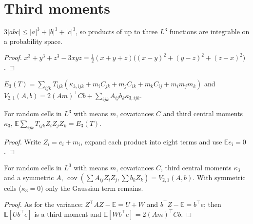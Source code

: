 \section{Third moments}

\begin{lemma}\label{lem:cumulants_integrable3}
  \leanok
  $3|abc| \le |a|^3 + |b|^3 + |c|^3$, so products of up to three $L^3$ functions are integrable
  on a probability space.
\end{lemma}
\begin{proof}
  \leanok
  $x^3 + y^3 + z^3 - 3xyz = \tfrac12(x+y+z)\bigl((x-y)^2 + (y-z)^2 + (z-x)^2\bigr)$.
\end{proof}

\begin{definition}\label{def:eCubic}
  \leanok
  $E_3(T) = \sum_{ijk} T_{ijk}(\kappa_{3,ijk} + m_iC_{jk} + m_jC_{ik} + m_kC_{ij} + m_im_jm_k)$ and
  $V_{2,1}(A, b) = 2(Am)^\top Cb + \sum_{ijk} A_{ij}b_k\kappa_{3,ijk}$.
\end{definition}

\begin{theorem}\label{thm:integral_cubic_of_cumulants}
  \leanok
  For random cells in $L^3$ with means $m$, covariances $C$ and third central moments
  $\kappa_3$, $\mathbb E\sum_{ijk}T_{ijk}Z_iZ_jZ_k = E_3(T)$.
\end{theorem}
\begin{proof}
  \leanok
  Write $Z_i = e_i + m_i$, expand each product into eight terms and use $\mathbb E e_i = 0$.
\end{proof}

\begin{theorem}\label{thm:covariance_quad_lin_of_cumulants}
  \leanok
  For random cells in $L^3$ with means $m$, covariances $C$, third central moments $\kappa_3$ and a
  symmetric $A$, $\operatorname{cov}(\sum A_{ij}Z_iZ_j, \sum b_kZ_k) = V_{2,1}(A, b)$. With
  symmetric cells ($\kappa_3 = 0$) only the Gaussian term remains.
\end{theorem}
\begin{proof}
  \leanok
  As for the variance: $Z^\top AZ - \mathbb E = U + W$ and $b^\top Z - \mathbb E = b^\top e$; then
  $\mathbb E[Ub^\top e]$ is a third moment and $\mathbb E[Wb^\top e] = 2(Am)^\top Cb$.
\end{proof}

